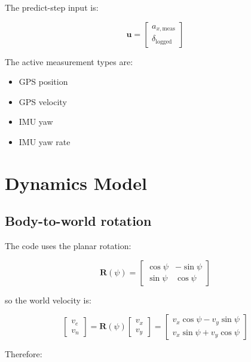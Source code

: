 \documentclass[11pt]{article}
\newcommand{\vect}[1]{\boldsymbol{#1}}
\newcommand{\mat}[1]{\mathbf{#1}}
\begin{document}
The predict-step input is:

\begin{equation}
\vect{u} =
\begin{bmatrix}
a_{x,\text{meas}} \\ \delta_{\text{logged}}
\end{bmatrix}
\end{equation}

The active measurement types are:

\begin{itemize}
    \item GPS position
    \item GPS velocity
    \item IMU yaw
    \item IMU yaw rate
\end{itemize}

\section{Dynamics Model}

\subsection{Body-to-world rotation}

The code uses the planar rotation:

\begin{equation}
\mat{R}(\psi) =
\begin{bmatrix}
\cos\psi & -\sin\psi \\
\sin\psi & \cos\psi
\end{bmatrix}
\end{equation}

so the world velocity is:

\begin{equation}
\begin{bmatrix}
v_e \\ v_n
\end{bmatrix}
=
\mat{R}(\psi)
\begin{bmatrix}
v_x \\ v_y
\end{bmatrix}
=
\begin{bmatrix}
v_x\cos\psi - v_y\sin\psi \\
v_x\sin\psi + v_y\cos\psi
\end{bmatrix}
\end{equation}

Therefore:
\end{document}
